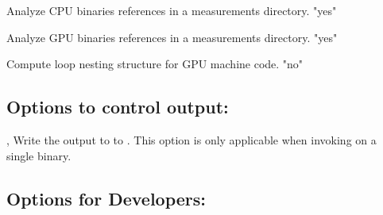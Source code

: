 \documentclass[english]{article}
\begin{document}
\begin{Description}

\item[\OptArg{--cpu}{"yes"/"no"}]
Analyze CPU binaries references in a measurements directory. {"yes"}

\item[\OptArg{--gpu}{"yes"/"no"}]
Analyze GPU binaries references in a measurements directory. {"yes"}

\item[\OptArg{--gpucfg}{"yes"/"no"}]
Compute loop nesting structure for GPU machine code. {"no"}


% 

\end{Description}

\subsection{Options to control output:}
\begin{Description}

\item[\OptArg{-o}{filename}, \OptArg{--output}{filename}]
Write the output to to .  This option is only applicable when invoking
 on a single binary.

\end{Description}

\subsection{Options for Developers:}
\end{document}
